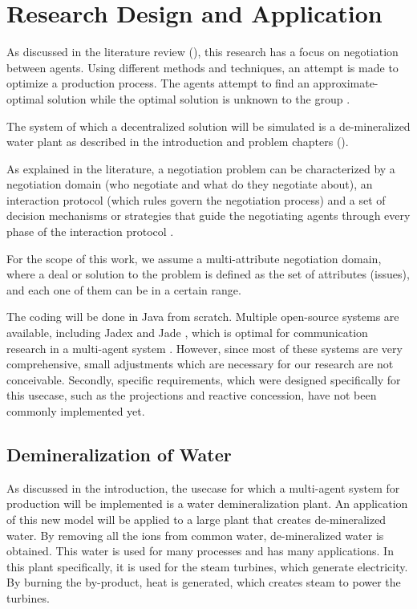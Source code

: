 \chapter{Research Design and Application}
\label{ch:design}
As discussed in the literature review  (), this research has a focus on negotiation between agents. Using different methods and techniques, an attempt is made to optimize a production process. The agents attempt to find an approximate-optimal solution while the optimal solution is unknown to the group . %

The system of which a decentralized solution will be simulated is a de-mineralized water plant as described in the introduction and problem chapters ().

As explained in the literature, a negotiation problem can be characterized by a negotiation domain (who negotiate and what do they negotiate about), an interaction protocol (which rules govern the negotiation process) and a set of decision mechanisms or strategies that guide the negotiating agents through every phase of the interaction protocol \citep{fatima2014principles}.

For the scope of this work, we assume a multi-attribute negotiation domain, where a deal or solution to the problem is defined as the set of attributes (issues), and each one of them can be in a certain range.

The coding will be done in Java from scratch. Multiple open-source systems are available, including Jadex and Jade \citep{bellifemine2007developing}, which is optimal for communication research in a multi-agent system \citep{kravari2015survey}. However, since most of these systems are very comprehensive, small adjustments which are necessary for our research are not conceivable. Secondly, specific requirements, which were designed specifically for this usecase, such as the projections and reactive concession, have not been commonly implemented yet. 

\section{Demineralization of Water}
\label{sec:demi}
As discussed in the introduction, the usecase for which a multi-agent system for production will be implemented is a water demineralization plant. An application of this new model will be applied to a large plant that creates de-mineralized water. By removing all the ions from common water, de-mineralized water is obtained. This water is used for many processes and has many applications. In this plant specifically, it is used for the steam turbines, which generate electricity. By burning the by-product, heat is generated, which creates steam to power the turbines. 

